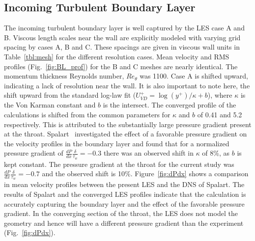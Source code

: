 \documentclass[]{aiaa-tc}%
\begin{document}


\subsection{Incoming Turbulent Boundary Layer}

The incoming turbulent boundary layer is well captured by the LES case A and B.  Viscous length scales near the wall are explicitly modeled with varying grid spacing by cases A, B and C.  These spacings are given in viscous wall units in Table~\ref{tbl:mesh} for the different resolution cases.  Mean velocity and RMS profiles (Fig.~\ref{fig:BL_prof}) for the B and C meshes are nearly identical.  The momentum thickness Reynolds number, $Re_\theta$ was 1100.  Case A is shifted upward, indicating a lack of resolution near the wall.  It is also important to note here, the shift upward from the standard log-law fit ($U_{VD}^+ = \log(y^+) / \kappa+ b $), where $\kappa$ is the Von Karman constant and $b$ is the intersect.  The converged profile of the calculations is shifted from the common parameters for $\kappa$ and $b$ of 0.41 and 5.2 respectively.  This is attributed to the substantially large pressure gradient present at the throat.  Spalart~\cite{Spalart:93} investigated the effect of a favorable pressure gradient on the velocity profiles in the boundary layer and found that for a normalized pressure gradient of $\frac{dP}{dx}\frac{\delta}{\tau_w} = -0.3$ there was an observed shift in $\kappa$ of 8\%, as $b$ is kept constant.  The pressure gradient at the throat for the current study was $\frac{dP}{dx}\frac{\delta}{\tau_w} = -0.7$ and the observed shift is 10\%.  Figure~\ref{fig:dPdx} shows a comparison in mean velocity profiles between the present LES and the DNS of Spalart.  The results of Spalart and the converged LES profiles indicate that the calculation is accurately capturing the boundary layer and the effect of the favorable pressure gradient.  In the converging section of the throat, the LES does not model the geometry and hence will have a different pressure gradient than the experiment (Fig.~\ref{fig:dPdx}).
\end{document}
